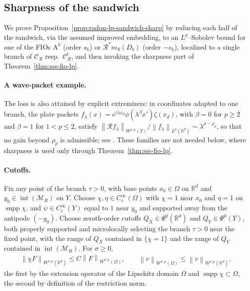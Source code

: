 \documentclass[12pt]{article}
\numberwithin{equation}{section}
\numberwithin{figure}{section}
\numberwithin{equation}{section}
\newcommand{\R}{\mathbb{R}}
\newcommand{\MR}{\mathcal M_R}
\newcommand{\norm}[1]{\left\|#1\right\|}
\DeclareMathOperator{\supp}{supp}
\begin{document}
\subsection{Sharpness of the sandwich}
\label{app:sharpness}

We prove Proposition~\ref{prop:radon-lp-sandwich-sharp} by reducing each half of the
sandwich, via the assumed improved embedding, to an $L^p$--Sobolev bound for one of the
FIOs $\mathrm A^k$ (order $s_k$) or $\mathcal R^{*}m_S(D_b)$ (order $-s_k$), localized to a
single branch of $\mathcal C_{\mathcal R}$ resp.\ $\mathcal C_{\mathcal R}^{t}$, and then
invoking the sharpness part of Theorem~\ref{thm:sss-fio-lp}.

\paragraph{A wave-packet example.}
The loss is also attained by explicit extremizers: in coordinates adapted to one branch,
the plate packets $f_\lambda(x)=e^{i\lambda x_d}\phi(\lambda^{\beta}x')\zeta(x_d)$, with
$\beta=0$ for $p\ge2$ and $\beta=1$ for $1<p\le2$, satisfy
$\norm{\mathcal Rf_\lambda}_{W^{\rho,p}(Y)}/\norm{f_\lambda}_{L^p(\R^d)}\sim\lambda^{\rho-\rho_p}$,
so that no gain beyond $\rho_p$ is admissible; see
\cite{peral_LpEstimatesWave_1980,seeger1991regularity,sogge_FourierIntegralsClassical_2017}.
These families are not needed below, where sharpness is used only through
Theorem~\ref{thm:sss-fio-lp}.

\paragraph{Cutoffs.}
Fix any point of the branch $\tau>0$, with base points $x_0\in\Omega$ on $\R^d$ and
$y_0\in\operatorname{int}(\MR)$ on $Y$. Choose $\chi,\eta\in C_c^\infty(\Omega)$ with
$\chi=1$ near $x_0$ and $\eta=1$ on $\supp\chi$, and $\psi\in C_c^\infty(Y)$ equal to $1$
near $y_0$ and supported away from the antipode $(-y_0)$. Choose zeroth-order cutoffs
$Q_X\in\Psi^0(\R^d)$ and $Q_Y\in\Psi^0(Y)$, both properly supported and microlocally
selecting the branch $\tau>0$ near the fixed point, with the range of $Q_X$ contained in
$\{\chi=1\}$ and the range of $Q_Y$ contained in $\operatorname{int}(\MR)$. For $\sigma\ge0$,
\begin{align}
    \norm{\chi F}_{W^{\sigma,p}(\R^d)}\le C\norm{F}_{W^{\sigma,p}(\Omega)},
    \qquad
    \norm{v}_{W^{\sigma,p}(\Omega)}\le\norm{v}_{W^{\sigma,p}(\R^d)},
    \label{eq:sharp-norm-transfer}
\end{align}
the first by the extension operator of the Lipschitz domain $\Omega$ and $\supp\chi\subset\Omega$,
the second by definition of the restriction norm.
\end{document}
